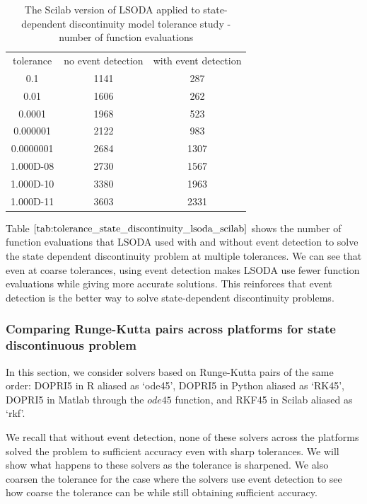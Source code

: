 \begin{table}[h]
\caption {The Scilab version of LSODA applied to state-dependent discontinuity model tolerance study - number of function evaluations} \label{tab:tolerance_state_discontinuity_lsoda_scilab} 
\begin{center}
\begin{tabular}{ c c c }
tolerance & no event detection & with event detection \\
0.1 & 1141 & 287 \\
0.01 & 1606 & 262 \\
0.0001 & 1968 & 523 \\
0.000001 & 2122 & 983 \\
0.0000001 & 2684 & 1307 \\
1.000D-08 & 2730 & 1567 \\
1.000D-10 & 3380 & 1963 \\
1.000D-11 & 3603 & 2331 \\
\end{tabular}
\end{center}
\end{table}

Table $\ref{tab:tolerance_state_discontinuity_lsoda_scilab}$ shows the number of function evaluations that LSODA used with and without event detection to solve the state dependent discontinuity problem at multiple tolerances. We can see that even at coarse tolerances, using event detection makes LSODA use fewer function evaluations while giving more accurate solutions. This reinforces that event detection is the better way to solve state-dependent discontinuity problems. 

\subsubsection{Comparing Runge-Kutta pairs across platforms for state discontinuous problem}
In this section, we consider solvers based on Runge-Kutta pairs of the same order: DOPRI5 in R aliased as `ode45', DOPRI5 in Python aliased as `RK45', DOPRI5 in Matlab through the $ode45$ function, and RKF45 in Scilab aliased as `rkf'.

We recall that without event detection, none of these solvers across the platforms solved the problem to sufficient accuracy even with sharp tolerances. We will show what happens to these solvers as the tolerance is sharpened. We also coarsen the tolerance for the case where the solvers use event detection to see how coarse the tolerance can be while still obtaining sufficient accuracy.

